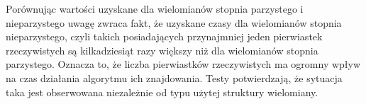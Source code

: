 Porównując wartości uzyskane dla wielomianów stopnia parzystego i nieparzystego uwagę zwraca fakt, że uzyskane czasy dla wielomianów stopnia nieparzystego, czyli takich posiadających przynajmniej jeden pierwiastek rzeczywistych są kilkadziesiąt razy większy niż dla wielomianów stopnia parzystego. Oznacza to, że liczba pierwiastków rzeczywistych ma ogromny wpływ na czas działania algorytmu ich znajdowania. Testy potwierdzają, że sytuacja taka jest obserwowana niezależnie od typu użytej struktury wielomiany.

